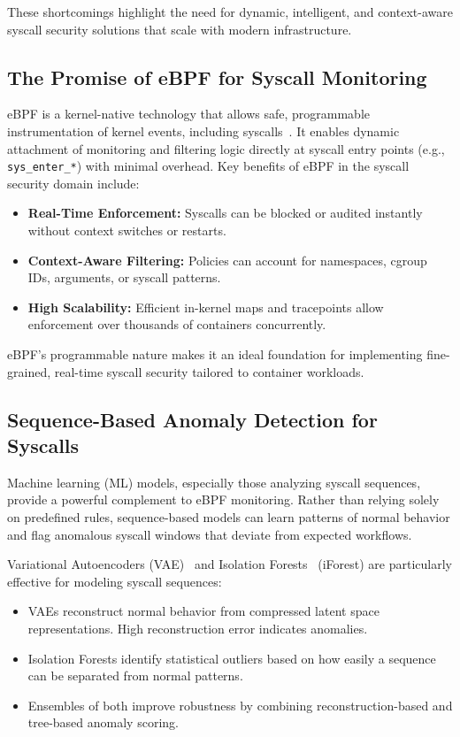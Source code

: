 These shortcomings highlight the need for dynamic, intelligent, and context-aware syscall
security solutions that scale with modern infrastructure.

\subsection{The Promise of eBPF for Syscall Monitoring}
\label{subsec:ebpf}

eBPF is a kernel-native technology that allows safe, programmable instrumentation of kernel
events, including syscalls~\cite{ref20_bpf_security}. It enables dynamic attachment of monitoring
and filtering logic directly at syscall entry points (e.g., \texttt{sys\_enter\_*}) with minimal
overhead. Key benefits of eBPF in the syscall security domain include:

\begin{itemize}
  \item \textbf{Real-Time Enforcement:} Syscalls can be blocked or audited instantly without
        context switches or restarts.
  \item \textbf{Context-Aware Filtering:} Policies can account for namespaces, cgroup IDs,
        arguments, or syscall patterns.
  \item \textbf{High Scalability:} Efficient in-kernel maps and tracepoints allow enforcement
        over thousands of containers concurrently.
\end{itemize}

eBPF's programmable nature makes it an ideal foundation for implementing fine-grained, real-time
syscall security tailored to container workloads.

\subsection{Sequence-Based Anomaly Detection for Syscalls}
\label{subsec:sequence_anomaly}

Machine learning (ML) models, especially those analyzing syscall sequences, provide a powerful
complement to eBPF monitoring. Rather than relying solely on predefined rules, sequence-based
models can learn patterns of normal behavior and flag anomalous syscall windows that deviate from
expected workflows.

Variational Autoencoders (VAE)~\cite{vae_kingma} and Isolation
Forests~\cite{iforest_liu} (iForest) are particularly effective for modeling syscall sequences:

\begin{itemize}
  \item VAEs reconstruct normal behavior from compressed latent space representations. High
        reconstruction error indicates anomalies.
  \item Isolation Forests identify statistical outliers based on how easily a sequence can be
        separated from normal patterns.
  \item Ensembles of both improve robustness by combining reconstruction-based and tree-based
        anomaly scoring.
\end{itemize}

